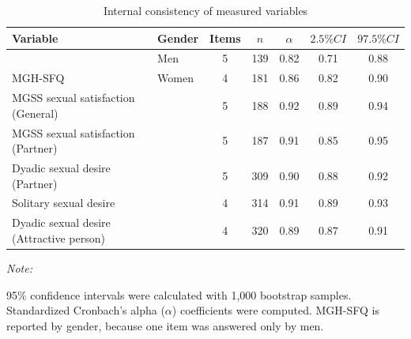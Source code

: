\documentclass[
  bookmarksnumbered]{article}
\newenvironment{Shaded}{\begin{snugshade}}{\end{snugshade}}
\newcommand{\AttributeTok}[1]{\textcolor[rgb]{0.80,0.80,0.80}{#1}}
\newcommand{\ConstantTok}[1]{\textcolor[rgb]{0.86,0.64,0.64}{\textbf{#1}}}
\newcommand{\FunctionTok}[1]{\textcolor[rgb]{0.94,0.94,0.56}{#1}}
\newcommand{\NormalTok}[1]{\textcolor[rgb]{0.80,0.80,0.80}{#1}}
\newcommand{\SpecialCharTok}[1]{\textcolor[rgb]{0.86,0.64,0.64}{#1}}
\newcommand{\StringTok}[1]{\textcolor[rgb]{0.80,0.58,0.58}{#1}}
\begin{document}
\begin{Shaded}
\end{Shaded}

\begin{table}[H]

\caption{\label{tab:Cronbach-tab}Internal consistency of measured variables}
\centering
\begin{threeparttable}
\begin{tabular}[t]{llccccc}
\toprule
Variable & Gender & Items & $n$ & $\alpha$ & $2.5\% CI$ & $97.5\% CI$\\
\midrule
 & Men & 5 & 139 & 0.82 & 0.71 & 0.88\\
\cmidrule{2-7}
\multirow{-2}{*}{\raggedright\arraybackslash MGH-SFQ} & Women & 4 & 181 & 0.86 & 0.82 & 0.90\\
\cmidrule{1-7}
MGSS sexual satisfaction (General) &  & 5 & 188 & 0.92 & 0.89 & 0.94\\
\cmidrule{1-7}
MGSS sexual satisfaction (Partner) &  & 5 & 187 & 0.91 & 0.85 & 0.95\\
\cmidrule{1-7}
Dyadic sexual desire (Partner) &  & 5 & 309 & 0.90 & 0.88 & 0.92\\
\cmidrule{1-7}
Solitary sexual desire &  & 4 & 314 & 0.91 & 0.89 & 0.93\\
\cmidrule{1-7}
Dyadic sexual desire (Attractive person) &  & 4 & 320 & 0.89 & 0.87 & 0.91\\
\bottomrule
\end{tabular}
\begin{tablenotes}[para]
\item \textit{Note: } 
\item 95\% confidence intervals were calculated with 1,000 bootstrap samples.
           Standardized Cronbach's alpha ($\alpha$) coefficients were computed. 
           MGH-SFQ is reported by gender, because one item was answered only by men.
\end{tablenotes}
\end{threeparttable}
\end{table}
\end{document}

